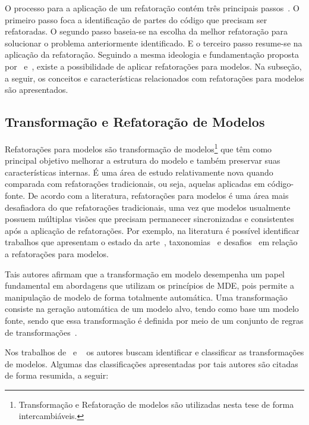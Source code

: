 O processo para a aplicação de um refatoração contém três principais passos~\cite{Wake_2003}. O primeiro passo foca a identificação de partes do código que precisam ser refatoradas. O segundo passo baseia-se na escolha da melhor refatoração para solucionar o problema anteriormente identificado. E o terceiro passo resume-se na aplicação da refatoração. Seguindo a mesma ideologia e fundamentação proposta por~ e~, existe a possibilidade de aplicar refatorações para modelos. Na subseção, a seguir, os conceitos e características relacionados com refatorações para modelos são apresentados.


\subsection{Transformação e Refatoração de Modelos}\label{sec:transformacoes_de_modelos}

Refatorações para modelos são transformação de modelos\footnote{Transformação e Refatoração de modelos são utilizadas nesta tese de forma intercambiáveis.} que têm como principal objetivo melhorar a estrutura do modelo e também preservar suas características internas. É uma área de estudo relativamente nova quando comparada com refatorações tradicionais, ou seja, aquelas aplicadas em código-fonte. De acordo com a literatura, refatorações para modelos é uma área mais desafiadora do que refatorações tradicionais, uma vez que modelos usualmente possuem múltiplas visões que precisam permanecer sincronizadas e consistentes após a aplicação de refatorações. Por exemplo, na literatura é possível identificar trabalhos que apresentam o estado da arte~\cite{Tom_2008_2008}, taxonomias~\cite{Maddeh_2010} e desafios~\cite{mens_03_refactoring, Mens07RefacTools, Van_Der_Straeten_2009, mens2003refactoring_novo_rafa} em relação a refatorações para modelos. 

Tais autores afirmam que a transformação em modelo desempenha um papel fundamental em abordagens que utilizam os princípios de MDE, pois permite a manipulação de modelo de forma totalmente automática. Uma transformação consiste na geração automática de um modelo alvo, tendo como base um modelo fonte, sendo que essa transformação é definida por meio de um conjunto de regras de transformações~\cite{Mens_2006}. 

Nos trabalhos de~ e ~ os autores buscam identificar e classificar as transformações de modelos. Algumas das classificações apresentadas por tais autores são citadas de forma resumida, a seguir:

